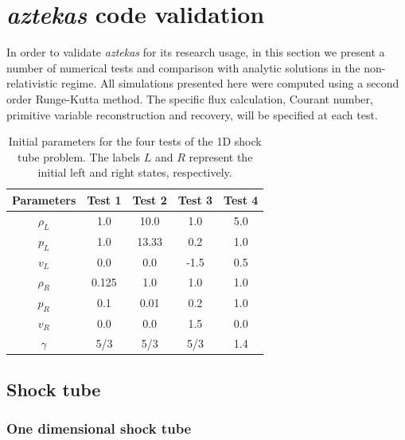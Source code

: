 

\section{\textit{aztekas} code validation}
\label{sec:codevalid}

In order to validate \textit{aztekas} for its research usage, in this section we present a number of numerical tests and comparison with analytic solutions in the non-relativistic regime. All simulations presented here were computed using a second order Runge-Kutta method. The specific flux calculation, Courant number, primitive variable reconstruction and recovery, will be specified at each test.

\begin{table}
    \centering
    \caption{Initial parameters for the four tests of the 1D shock tube problem. The labels $L$ and $R$ represent the initial left and right states, respectively.}
    \begin{tabular}{c|cccc}
    \hline 
    Parameters & Test 1 & Test 2 & Test 3 & Test 4  \\
    \hline 
    $\rho_L$ & 1.0   & 10.0  & 1.0  & 5.0 \\
    $p_L$    & 1.0   & 13.33 & 0.2  & 1.0 \\
    $v_L$    & 0.0   & 0.0   & -1.5 & 0.5 \\
    $\rho_R$ & 0.125 & 1.0   & 1.0  & 1.0 \\
    $p_R$    & 0.1   & 0.01  & 0.2  & 1.0 \\
    $v_R$    & 0.0   & 0.0   & 1.5  & 0.0 \\
    $\gamma$ & 5/3   & 5/3   & 5/3  & 1.4 \\
    \hline
    \end{tabular}
    \label{tab:sod}
\end{table}


\subsection{Shock tube}
\label{subsec:sod}

\subsubsection{One dimensional shock tube}
\label{subsubsec:shock}

